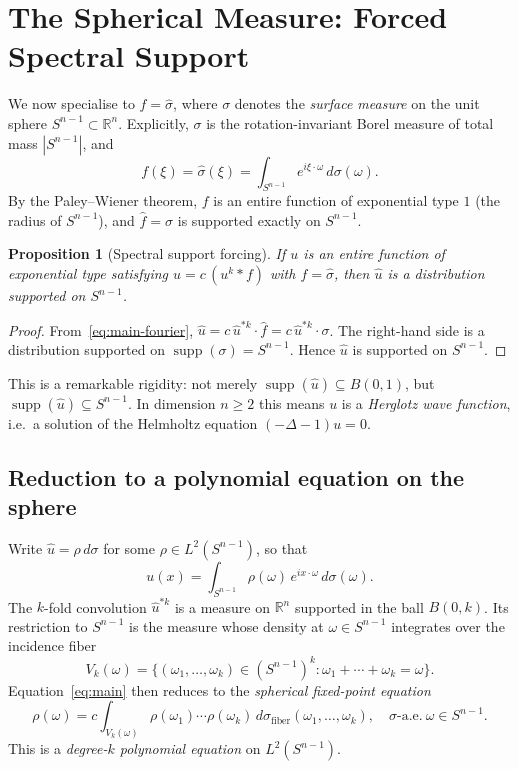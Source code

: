 \documentclass[12pt]{article}
\newtheorem{proposition}[theorem]{Proposition}
\DeclareMathOperator{\supp}{supp}
\newcommand{\R}{\mathbb{R}}
\newcommand{\wh}{\widehat}
\newcommand{\abs}[1]{\left|#1\right|}
\begin{document}
\section{The Spherical Measure: Forced Spectral Support}

We now specialise to $f = \wh{\sigma}$, where $\sigma$ denotes the
\emph{surface measure} on the unit sphere $S^{n-1} \subset \R^n$.
Explicitly, $\sigma$ is the rotation-invariant Borel measure of total mass
$\abs{S^{n-1}}$, and
\[
  f(\xi) = \wh{\sigma}(\xi) = \int_{S^{n-1}} e^{i\xi\cdot\omega}\,d\sigma(\omega).
\]
By the Paley--Wiener theorem, $f$ is an entire function of exponential type $1$
(the radius of $S^{n-1}$), and $\wh{f} = \sigma$ is supported exactly on $S^{n-1}$.

\begin{proposition}[Spectral support forcing]
  \label{prop:support-forcing}
  If $u$ is an entire function of exponential type satisfying
  $u = c\,(u^k \ast f)$ with $f = \wh{\sigma}$, then $\wh{u}$ is a
  distribution supported on $S^{n-1}$.
\end{proposition}

\begin{proof}
  From~\eqref{eq:main-fourier}, $\wh{u} = c\,\wh{u}^{\ast k}\cdot\wh{f}
  = c\,\wh{u}^{\ast k}\cdot\sigma$.
  The right-hand side is a distribution supported on $\supp(\sigma) = S^{n-1}$.
  Hence $\wh{u}$ is supported on $S^{n-1}$.
\end{proof}

This is a remarkable rigidity: not merely $\supp(\wh{u}) \subseteq B(0,1)$,
but $\supp(\wh{u}) \subseteq S^{n-1}$.
In dimension $n \geq 2$ this means $u$ is a \emph{Herglotz wave function},
i.e.\ a solution of the Helmholtz equation $(-\Delta - 1)u = 0$.

\subsection{Reduction to a polynomial equation on the sphere}

Write $\wh{u} = \rho\,d\sigma$ for some $\rho \in L^2(S^{n-1})$,
so that
\[
  u(x) = \int_{S^{n-1}} \rho(\omega)\,e^{ix\cdot\omega}\,d\sigma(\omega).
\]
The $k$-fold convolution $\wh{u}^{\ast k}$ is a measure on $\R^n$ supported
in the ball $B(0,k)$.
Its restriction to $S^{n-1}$ is the measure whose density at
$\omega \in S^{n-1}$ integrates over the incidence fiber
\[
  V_k(\omega) = \bigl\{(\omega_1,\ldots,\omega_k)\in (S^{n-1})^k :
    \omega_1+\cdots+\omega_k = \omega\bigr\}.
\]
Equation~\eqref{eq:main} then reduces to the \emph{spherical fixed-point equation}
\begin{equation}
  \label{eq:sphere-eq}
  \rho(\omega) = c\int_{V_k(\omega)}\rho(\omega_1)\cdots\rho(\omega_k)
    \,d\sigma_{\mathrm{fiber}}(\omega_1,\ldots,\omega_k),
  \quad \sigma\text{-a.e.}\ \omega \in S^{n-1}.
\end{equation}
This is a \emph{degree-$k$ polynomial equation} on $L^2(S^{n-1})$.
\end{document}
